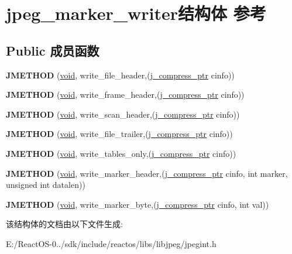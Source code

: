 \hypertarget{structjpeg__marker__writer}{}\section{jpeg\+\_\+marker\+\_\+writer结构体 参考}
\label{structjpeg__marker__writer}
\subsection*{Public 成员函数}
\begin{DoxyCompactItemize}
\item 
\mbox{\label{structjpeg__marker__writer_ac5570409054c19f502583dff69fb8fab}} 
{\bfseries J\+M\+E\+T\+H\+OD} (\hyperlink{interfacevoid}{void}, write\+\_\+file\+\_\+header,(\hyperlink{structjpeg__compress__struct}{j\+\_\+compress\+\_\+ptr} cinfo))
\item 
\mbox{\label{structjpeg__marker__writer_a16553ec95a48ff5d49a1c698541eb859}} 
{\bfseries J\+M\+E\+T\+H\+OD} (\hyperlink{interfacevoid}{void}, write\+\_\+frame\+\_\+header,(\hyperlink{structjpeg__compress__struct}{j\+\_\+compress\+\_\+ptr} cinfo))
\item 
\mbox{\label{structjpeg__marker__writer_a696bbc698ad5760bbeb1614f9e6a7509}} 
{\bfseries J\+M\+E\+T\+H\+OD} (\hyperlink{interfacevoid}{void}, write\+\_\+scan\+\_\+header,(\hyperlink{structjpeg__compress__struct}{j\+\_\+compress\+\_\+ptr} cinfo))
\item 
\mbox{\label{structjpeg__marker__writer_affc544100d40a2c75c8e438569ea7844}} 
{\bfseries J\+M\+E\+T\+H\+OD} (\hyperlink{interfacevoid}{void}, write\+\_\+file\+\_\+trailer,(\hyperlink{structjpeg__compress__struct}{j\+\_\+compress\+\_\+ptr} cinfo))
\item 
\mbox{\label{structjpeg__marker__writer_ac0791e1ab4eb10f20144a84a1f0371dc}} 
{\bfseries J\+M\+E\+T\+H\+OD} (\hyperlink{interfacevoid}{void}, write\+\_\+tables\+\_\+only,(\hyperlink{structjpeg__compress__struct}{j\+\_\+compress\+\_\+ptr} cinfo))
\item 
\mbox{\label{structjpeg__marker__writer_a9719adf2a97800fee631854f46222889}} 
{\bfseries J\+M\+E\+T\+H\+OD} (\hyperlink{interfacevoid}{void}, write\+\_\+marker\+\_\+header,(\hyperlink{structjpeg__compress__struct}{j\+\_\+compress\+\_\+ptr} cinfo, int marker, unsigned int datalen))
\item 
\mbox{\label{structjpeg__marker__writer_a193395c80dab66a95681aff53cd5c468}} 
{\bfseries J\+M\+E\+T\+H\+OD} (\hyperlink{interfacevoid}{void}, write\+\_\+marker\+\_\+byte,(\hyperlink{structjpeg__compress__struct}{j\+\_\+compress\+\_\+ptr} cinfo, int val))
\end{DoxyCompactItemize}


该结构体的文档由以下文件生成\+:\begin{DoxyCompactItemize}
\item 
E\+:/\+React\+O\+S-\/0../sdk/include/reactos/libs/libjpeg/jpegint.\+h\end{DoxyCompactItemize}
